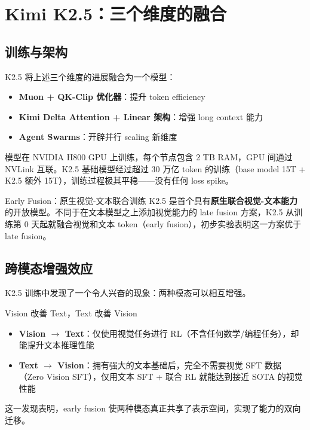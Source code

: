 \section{Kimi K2.5：三个维度的融合}

\subsection{训练与架构}

K2.5 将上述三个维度的进展融合为一个模型：
\begin{itemize}
    \item \textbf{Muon + QK-Clip 优化器}：提升 token efficiency
    \item \textbf{Kimi Delta Attention + Linear 架构}：增强 long context 能力
    \item \textbf{Agent Swarms}：开辟并行 scaling 新维度
\end{itemize}

模型在 NVIDIA H800 GPU 上训练，每个节点包含 2 TB RAM，GPU 间通过 NVLink 互联。K2.5 基础模型经过超过 30 万亿 token 的训练（base model 15T + K2.5 额外 15T），训练过程极其平稳——没有任何 loss spike。

\begin{importantbox}{Early Fusion：原生视觉-文本联合训练}
K2.5 是首个具有\textbf{原生联合视觉-文本能力}的开放模型。不同于在文本模型之上添加视觉能力的 late fusion 方案，K2.5 从训练第 0 天起就融合视觉和文本 token（early fusion），初步实验表明这一方案优于 late fusion。
\end{importantbox}

\subsection{跨模态增强效应}

K2.5 训练中发现了一个令人兴奋的现象：两种模态可以相互增强。

\begin{importantbox}{Vision 改善 Text，Text 改善 Vision}
\begin{itemize}
    \item \textbf{Vision $\rightarrow$ Text}：仅使用视觉任务进行 RL（不含任何数学/编程任务），却能提升文本推理性能
    \item \textbf{Text $\rightarrow$ Vision}：拥有强大的文本基础后，完全不需要视觉 SFT 数据（Zero Vision SFT），仅用文本 SFT + 联合 RL 就能达到接近 SOTA 的视觉性能
\end{itemize}
这一发现表明，early fusion 使两种模态真正共享了表示空间，实现了能力的双向迁移。
\end{importantbox}


